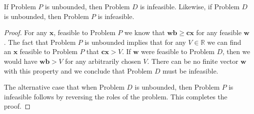 \begin{corollary} If Problem $P$ is unbounded, then Problem $D$ is infeasible. Likewise, if Problem $D$ is unbounded, then Problem $P$ is infeasible.
\label{cor:WeakDuality2}
\end{corollary} 
\begin{proof} For any $\mathbf{x}$, feasible to Problem $P$ we know  that $\mathbf{w}\mathbf{b} \geq \mathbf{c}\mathbf{x}$ for any feasible $\mathbf{w}$. The fact that Problem $P$ is unbounded implies that for any $V \in \mathbb{R}$ we can find an $\mathbf{x}$ feasible to Problem $P$ that $\mathbf{c}\mathbf{x} > V$. If $\mathbf{w}$ were feasible to Problem $D$, then we would have $\mathbf{w}\mathbf{b} > V$ for any arbitrarily chosen $V$. There can be no finite vector $\mathbf{w}$ with this property and we conclude that Problem $D$ must be infeasible. 

The alternative case that when Problem $D$ is unbounded, then Problem $P$ is infeasible follows by reversing the roles of the problem. This completes the proof.
\end{proof}

